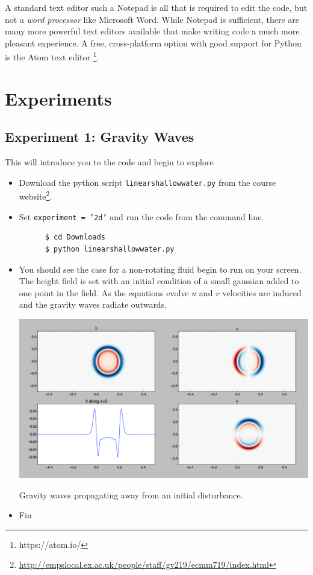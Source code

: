 \documentclass[a4paper]{tufte-handout}
\begin{document}
  A standard text editor such a Notepad is all that is required to edit the code, but not a \emph{word processor} like Microsoft Word.
  While Notepad is sufficient, there are many more powerful text editors available that make writing code a much more pleasant experience.
  A free, cross-platform option with good support for Python is the Atom text editor \footnote{https://atom.io/}.

  \section{Experiments}
  \label{sec:Experiments}

  \subsection{Experiment 1: Gravity Waves}
  \label{sub:Experiment 1}

  This will introduce you to the code and begin to explore

  \begin{itemize}
    \item Download the python script \texttt{linearshallowwater.py} from the
    course website\footnote{\url{http://empslocal.ex.ac.uk/people/staff/gv219/ecmm719/index.html}}.
    \item Set \texttt{experiment = '2d'} and run the code from the command line.
    \begin{verbatim}
      $ cd Downloads
      $ python linearshallowwater.py
    \end{verbatim}
    \item You should see the case for a non-rotating fluid begin to run on
    your screen.  The height field is set with an initial condition of a small
    gaussian added to one point in the field.  As the equations evolve $u$ and
    $v$ velocities are induced and the gravity waves radiate outwards.
    \begin{marginfigure}
      \includegraphics{gravity_waves}
      \caption{Gravity waves propagating away from an initial disturbance.}
      \label{fig:gravwaves}
    \end{marginfigure}
    \item Fin
  \end{itemize}
\end{document}
